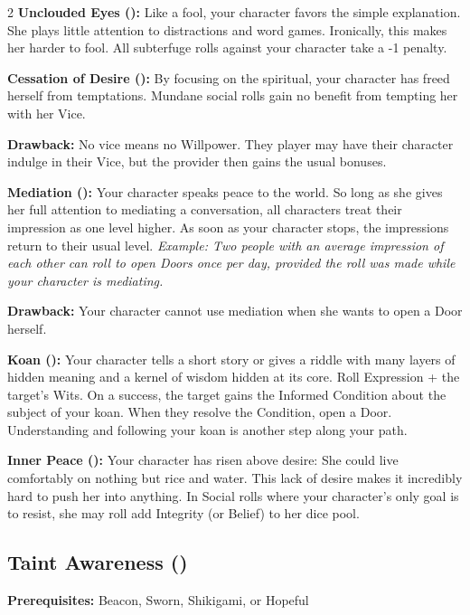 \begin{multicols}{2}
\textbf{Unclouded Eyes (\textbullet):} Like a fool, your character favors the simple explanation. She plays little attention to distractions and word games. Ironically, this makes her harder to fool. All subterfuge rolls against your character take a -1 penalty.

\textbf{Cessation of Desire (\textbullet\textbullet):} By focusing on the spiritual, your character has freed herself from temptations. Mundane social rolls gain no benefit from tempting her with her Vice.

\textbf{Drawback:} No vice means no Willpower. They player may have their character indulge in their Vice, but the provider then gains the usual bonuses.

\textbf{Mediation (\textbullet\textbullet\textbullet):} Your character speaks peace to the world. So long as she gives her full attention to mediating a conversation, all characters treat their impression as one level higher. As soon as your character stops, the impressions return to their usual level. \textit{Example: Two people with an average impression of each other can roll to open Doors once per day, provided the roll was made while your character is mediating.}

\textbf{Drawback:} Your character cannot use mediation when she wants to open a Door herself.

\textbf{Koan (\textbullet\textbullet\textbullet\textbullet):} Your character tells a short story or gives a riddle with many layers of hidden meaning and a kernel of wisdom hidden at its core. Roll Expression + the target's Wits. On a success, the target gains the Informed Condition about the subject of your koan. When they resolve the Condition, open a Door. Understanding and following your koan is another step along your path.

\textbf{Inner Peace (\textbullet\textbullet\textbullet\textbullet\textbullet):} Your character has risen above desire: She could live comfortably on nothing but rice and water. This lack of desire makes it incredibly hard to push her into anything. In Social rolls where your character's only goal is to resist, she may roll add Integrity (or Belief) to her dice pool.

\subsection*{Taint Awareness (\textbullet\textbullet)}
\textbf{Prerequisites:} Beacon, Sworn, Shikigami, or Hopeful\\


\end{multicols}
